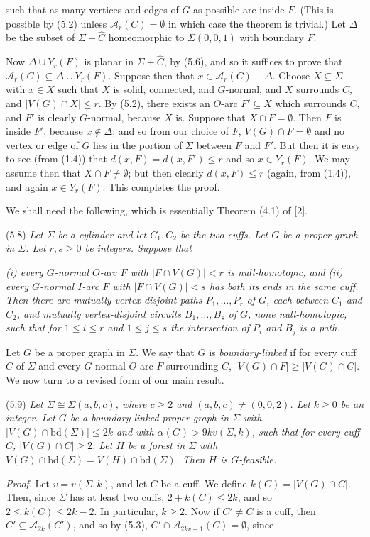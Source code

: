 \noindent such that as many vertices and edges of $G$ as possible are inside $F$. (This is possible by (5.2) unless $\mathscr{A}_r(C) = \emptyset$ in which case the theorem is trivial.) Let $\Delta$ be the subset of $\Sigma + \hat{C}$ homeomorphic to $\Sigma(0, 0, 1)$ with boundary $F$.

Now $\Delta \cup Y_r(F)$ is planar in $\Sigma + \hat{C}$, by (5.6), and so it suffices to prove that $\mathscr{A}_r(C) \subseteq \Delta \cup Y_r(F)$. Suppose then that $x \in \mathscr{A}_r(C) - \Delta$. Choose $X \subseteq \Sigma$ with $x \in X$ such that $X$ is solid, connected, and $G$-normal, and $X$ surrounds $C$, and $|V(G) \cap X| \le r$. By (5.2), there exists an $O$-arc $F' \subseteq X$ which surrounds $C$, and $F'$ is clearly $G$-normal, because $X$ is. Suppose that $X \cap F = \emptyset$. Then $F$ is inside $F'$, because $x \notin \Delta$; and so from our choice of $F$, $V(G) \cap F = \emptyset$ and no vertex or edge of $G$ lies in the portion of $\Sigma$ between $F$ and $F'$. But then it is easy to see (from (1.4)) that $d(x, F) = d(x, F') \le r$ and so $x \in Y_r(F)$. We may assume then that $X \cap F \ne \emptyset$; but then clearly $d(x, F) \le r$ (again, from (1.4)), and again $x \in Y_r(F)$. This completes the proof.

We shall need the following, which is essentially Theorem (4.1) of [2].

\stmt
(5.8) \textit{Let $\Sigma$ be a cylinder and let $C_1, C_2$ be the two cuffs. Let $G$ be a proper graph in $\Sigma$. Let $r, s \ge 0$ be integers. Suppose that}

\textit{(i) every $G$-normal $O$-arc $F$ with $|F \cap V(G)| < r$ is null-homotopic, and} \textit{(ii) every $G$-normal $I$-arc $F$ with $|F \cap V(G)| < s$ has both its ends in the same cuff.} \textit{Then there are mutually vertex-disjoint paths $P_1, \dots, P_r$ of $G$, each between $C_1$ and $C_2$, and mutually vertex-disjoint circuits $B_1, \dots, B_s$ of $G$, none null-homotopic, such that for $1 \le i \le r$ and $1 \le j \le s$ the intersection of $P_i$ and $B_j$ is a path.}

Let $G$ be a proper graph in $\Sigma$. We say that $G$ is \textit{boundary-linked} if for every cuff $C$ of $\Sigma$ and every $G$-normal $O$-arc $F$ surrounding $C$, $|V(G) \cap F| \ge |V(G) \cap C|$. We now turn to a revised form of our main result.

\stmt
(5.9) \textit{Let $\Sigma \cong \Sigma(a, b, c)$, where $c \ge 2$ and $(a, b, c) \ne (0, 0, 2)$. Let $k \ge 0$ be an integer. Let $G$ be a boundary-linked proper graph in $\Sigma$ with $|V(G) \cap \mathrm{bd}(\Sigma)| \le 2k$ and with $\alpha(G) > 9k v(\Sigma, k)$, such that for every cuff $C$, $|V(G) \cap C| \ge 2$. Let $H$ be a forest in $\Sigma$ with $V(G) \cap \mathrm{bd}(\Sigma) = V(H) \cap \mathrm{bd}(\Sigma)$. Then $H$ is $G$-feasible.}

\textit{Proof.} Let $v = v(\Sigma, k)$, and let $C$ be a cuff. We define $k(C) = |V(G) \cap C|$. Then, since $\Sigma$ has at least two cuffs, $2 + k(C) \le 2k$, and so $2 \le k(C) \le 2k - 2$. In particular, $k \ge 2$. Now if $C' \ne C$ is a cuff, then $C' \subseteq \mathscr{A}_{2k}(C')$, and so by (5.3), $C' \cap \mathscr{A}_{2kv - 1}(C) = \emptyset$, since
